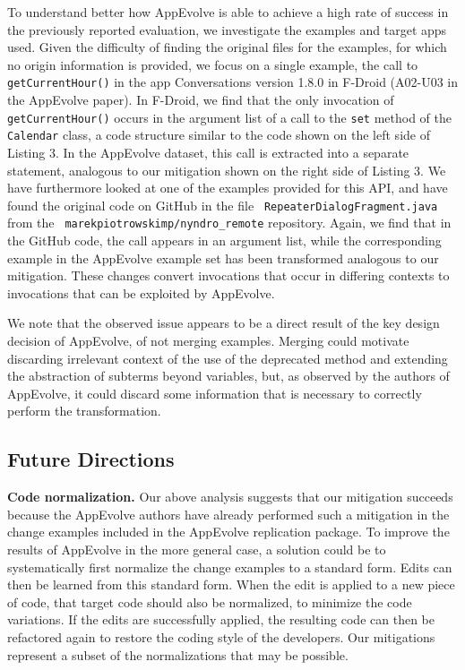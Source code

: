 To understand better how AppEvolve is able to achieve a high rate of
success in the previously reported evaluation, we investigate the examples
and target apps used.  Given the difficulty of finding the original files
for the examples, for which no origin information is provided, we focus on
a single example, the call to {\tt getCurrentHour()} in the app {\sc
  Conversations} version 1.8.0 in F-Droid (A02-U03 in the AppEvolve paper).
In F-Droid, we find that the only invocation of {\tt getCurrentHour()}
occurs in the argument list of a call to the {\tt set} method of the {\tt
  Calendar} class, a code structure similar to the code shown on the left
side of Listing 3.  In the AppEvolve dataset, this call is extracted into a
separate statement, analogous to our mitigation shown on the right side of
Listing 3.  We have furthermore looked at one of the examples provided for
this API, and have found the original code on GitHub in the file {\tt
  RepeaterDialogFragment.java} from the {\tt
  marekpiotrowskimp/nyndro\_remote} repository.  Again, we find that in the
GitHub code, the call appears in an argument list, while the corresponding
example in the AppEvolve example set has been transformed analogous to our
mitigation.  These changes convert invocations that occur in differing
contexts to invocations that can be exploited by AppEvolve.

We note that the observed issue appears to be a direct result of the key
design decision of AppEvolve, of not merging examples.  Merging could
motivate discarding irrelevant context of the use of the deprecated method
and extending the abstraction of subterms beyond variables, but, as observed
by the authors of AppEvolve, it could discard some information
that is necessary to correctly perform the transformation.

\subsection{Future Directions}

\noindent
{\bf Code normalization.}
Our above analysis suggests that our mitigation succeeds because the
AppEvolve authors have already performed such a mitigation in the change
examples included in the AppEvolve replication package.  To improve the
results of AppEvolve in the more general case, a solution could be to
systematically first normalize the change examples to a standard form.
Edits can then be learned from this standard form. When the edit is applied
to a new piece of code, that target code should also be normalized, to
minimize the code variations. If the edits are successfully applied, the
resulting code can then be refactored again to restore the coding style of
the developers.  Our mitigations represent a subset of the normalizations
that may be possible.


